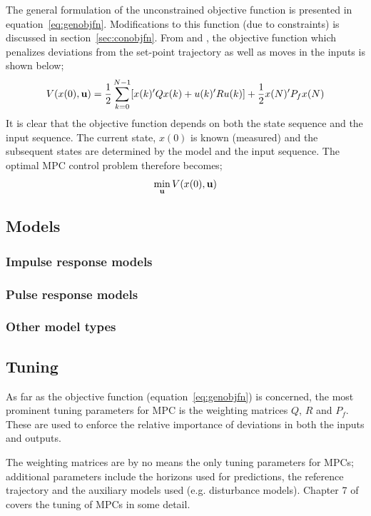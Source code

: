 The general formulation of the unconstrained objective function is presented in
equation~\ref{eq:genobjfn}. Modifications to this function (due to constraints)
is discussed in section~\ref{sec:conobjfn}. From \citet[17]{rawlings} and
\citet[41]{maciejowskimpc}, the objective function which penalizes deviations
from the set-point trajectory as well as moves in the inputs is shown below;
\begin{equation}
  \label{eq:genobjfn}
  V(x(0),{\bf u})=\frac{1}{2}\sum^{N-1}_{k=0}[x(k)'Qx(k)+u(k)'Ru(k)]
  + \frac{1}{2}x(N)'P_fx(N)
\end{equation}
It is clear that the objective function depends on both the state sequence and
the input sequence. The current state, $x(0)$ is known (measured) and the 
subsequent states are determined by the model and the input sequence. The
optimal MPC control problem therefore becomes;
\begin{equation}
  \label{eq:opctrlprob}
  \min_{\bf u} V(x(0),{\bf u})
\end{equation}
\subsection{Models}
\subsubsection{Impulse response models}
\subsubsection{Pulse response models}
\subsubsection{Other model types}
\subsection{Tuning}
As far as the objective function (equation~\ref{eq:genobjfn}) is concerned, the
most prominent tuning parameters for MPC is the weighting matrices $Q$, $R$ and
$P_f$. These are used to enforce the relative importance of deviations in both
the inputs and outputs.

The weighting matrices are by no means the only tuning parameters for MPCs;
additional parameters include the horizons used for predictions, the reference
trajectory and the auxiliary models used (e.g. disturbance models). Chapter 7
of \citet{maciejowskimpc} covers the tuning of MPCs in some detail.

